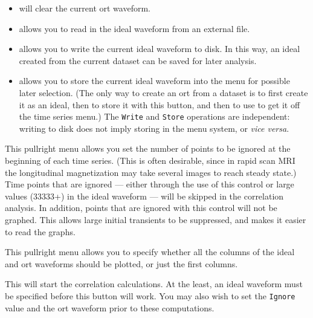 \begin{description}
\begin{itemize}
      \item {} will clear the current ort waveform.

      \item {} allows you to read in the ideal waveform
             from an external file.

      \item {} allows you to write the current ideal waveform
            to disk.  In this way, an ideal created from the current dataset
            can be saved for later analysis.

      \item {} allows you to store the current ideal waveform
            into the \afnit menu for possible later selection.
            (The only way to create an ort from a dataset is to first create
            it as an ideal, then to store it with this button, and then
            to use  to get it off the time series menu.)
            The {\tt Write} and {\tt Store} operations are independent:
            writing to disk does not imply storing in the menu system, or
            {\it vice versa}.
   \end{itemize}

    This pullright menu allows you set the number of points
                  to be ignored at the beginning of each time series.
                  (This is often desirable, since in rapid scan MRI the
                   longitudinal magnetization may take several images
                   to reach steady state.)  Time points that are ignored --- either
                  through the use of this control or large values (33333+) in
                  the ideal waveform --- will be skipped in the correlation
                  analysis.  In addition, points that are ignored with
                  this control will not be graphed.  This allows
                  large initial transients to be suppressed, and makes
                  it easier to read the graphs.

    This pullright menu allows you to specify whether
                     all the columns of the ideal and ort waveforms should
                     be plotted, or just the first columns.

    This will start the correlation calculations.
                       At the least, an ideal waveform must be specified
                       before this button will work.  You may also wish
                       to set the {\tt Ignore} value and the ort waveform
                       prior to these computations.


\end{description}
